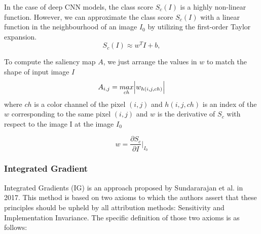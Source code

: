In the case of deep CNN models, the class score $S_c(I)$ is a highly non-linear function. However, we can approximate the class score $S_c(I)$ with a linear function in the neighbourhood of an image $I_0$ by utilizing the first-order Taylor expansion.
\begin{equation}
    S_c(I) \approx w^T I + b,
\end{equation}

To compute the saliency map $A$, we just arrange the values in $w$ to match the shape of input image $I$ 
\begin{equation}
A_{i, j} = \underset{ch}{max}\abs{w_{h(i, j, ch)}}
\end{equation}
 where $ch$ is a color channel of the pixel $(i,j)$ and $h(i,j,ch)$ is an index of the $w$ corresponding to the same pixel $(i,j)$ and $w$ is the derivative of $S_c$ with respect to the image I at the image $I_0$

\begin{equation}
    w = \frac{\partial S_c}{\partial I} \bigg \rvert_{I_0}
\end{equation}

\subsubsection{Integrated Gradient}
\label{subsubsec: IG}
Integrated Gradients (IG) is an approach proposed by Sundararajan et al. \cite{IG} in 2017. This method is based on two axioms to which the authors assert that these principles should be upheld by all attribution methods: Sensitivity and Implementation Invariance. The specific definition of those two axioms is as follows:

